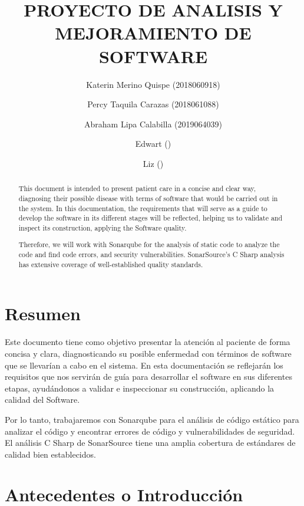 \documentclass[preprint,12pt,notitlepage]{elsarticle}
\begin{document}
	
	\begin{frontmatter}

		\title{\huge  PROYECTO DE  ANALISIS Y  MEJORAMIENTO DE  SOFTWARE }
		\author{Katerin Merino Quispe  (2018060918)}
		\author{Percy Taquila Carazas  (2018061088)}
		\author{Abraham Lipa Calabilla (2019064039)}
		\author{Edwart                ()}
		\author{Liz                ()}
		\address{Tacna, Perú}
		
\begin{abstract}
This document is intended to present patient care in a concise and clear way, diagnosing their possible disease with terms of software that would be carried out in the system. In this documentation, the requirements that will serve as a guide to develop the software in its different stages will be reflected, helping us to validate and inspect its construction, applying the Software quality.

Therefore, we will work with Sonarqube for the analysis of static code to analyze the code and find code errors, and security vulnerabilities. SonarSource's C Sharp analysis has extensive coverage of well-established quality standards.  
\end{abstract}

\end{frontmatter}

\section*{Resumen}

Este documento tiene como objetivo presentar la atención al paciente de forma concisa y clara, diagnosticando su posible enfermedad con términos de software que se llevarían a cabo en el sistema. En esta documentación se reflejarán los requisitos que nos servirán de guía para desarrollar el software en sus diferentes etapas, ayudándonos a validar e inspeccionar su construcción, aplicando la calidad del Software.

Por lo tanto, trabajaremos con Sonarqube para el análisis de código estático para analizar el código y encontrar errores de código y vulnerabilidades de seguridad. El análisis C Sharp de SonarSource tiene una amplia cobertura de estándares de calidad bien establecidos.

\section{Antecedentes o Introducción}
\end{document}
